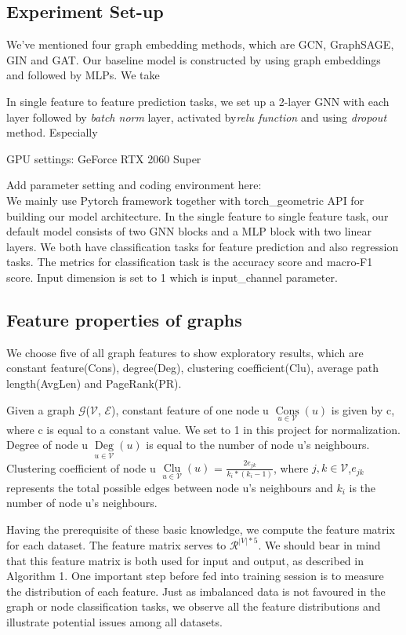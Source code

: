 \documentclass[sigconf]{acmart}
\begin{document}
\subsection{Experiment Set-up}
We've mentioned four graph embedding methods, which are GCN, GraphSAGE, GIN and GAT. 
Our baseline model is constructed by using graph embeddings and followed by MLPs. We take 

In single feature to feature prediction tasks, we set up a 2-layer GNN with each layer followed by \textit{batch norm}
layer, activated by\textit{relu function} and using \textit{dropout} method. Especially  

GPU settings: GeForce RTX 2060 Super



Add parameter setting and coding environment here:\\

We mainly use Pytorch framework together with torch\_geometric API for building our model architecture.  In the single feature to single feature task, our default model consists of two GNN blocks and a MLP block with two linear layers. We both have classification tasks for feature prediction and also regression tasks. The metrics for classification task is the accuracy score and macro-F1 score. Input dimension is set to 1 which is input\_channel parameter. 

\subsection{Feature properties of graphs}
We choose five of all graph features to show exploratory results, which are constant feature(Cons), degree(Deg), clustering coefficient(Clu), average path length(AvgLen) and PageRank(PR).

Given a graph $\mathcal{G}$($\mathcal{V}$, $\mathcal{E}$), constant feature of one node u $\mathop{Cons}\limits_{u \in \mathcal{V}}(u)$ is given by c, where c is equal to a constant value. We set to 1 in this project for normalization. Degree of node u $\mathop{Deg}\limits_{u \in \mathcal{V}}(u)$ is equal to the number of node u's neighbours. Clustering coefficient of node u $\mathop{Clu}\limits_{u \in \mathcal{V}}(u)$ = $\frac{2e_{jk}}{k_{i} * (k_{i} - 1)}$, where $j,k \in \mathcal{V}$,$e_{jk}$ represents the total possible edges between node u's neighbours and $k_{i}$ is the number of node u's neighbours.

Having the prerequisite of these basic knowledge, we compute the feature matrix for each dataset. The feature matrix serves to $\mathcal{R}^{|V|*5}$. We should bear in mind that this feature matrix is both used for input and output, as described in Algorithm 1. One important step before fed into training session is to measure the distribution of each feature. Just as imbalanced data is not favoured in the graph or node classification tasks, we observe all the feature distributions and illustrate potential issues among all datasets.
\end{document}
